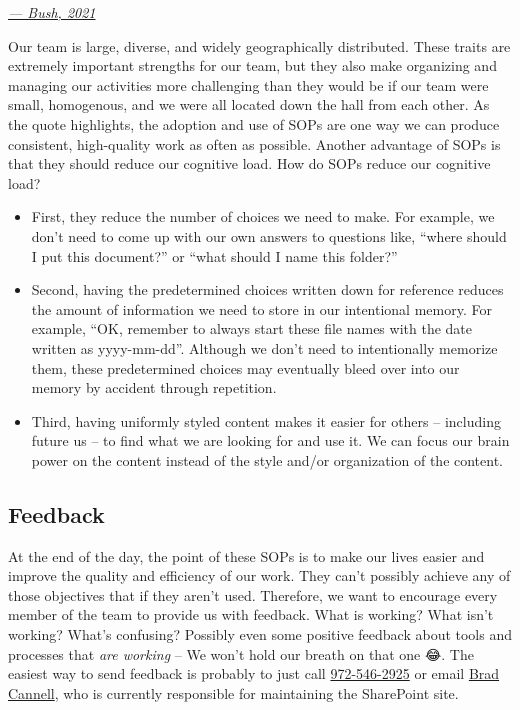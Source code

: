 \documentclass[
  letterpaper,
  DIV=11,
  numbers=noendperiod]{scrreprt}
\providecommand{\tightlist}{%
  \setlength{\itemsep}{0pt}\setlength{\parskip}{0pt}}\usepackage{longtable,booktabs,array}
\begin{document}
\emph{\href{https://www.techtarget.com/searchbusinessanalytics/definition/standard-operating-procedure-SOP}{---
Bush, 2021}}

Our team is large, diverse, and widely geographically distributed. These
traits are extremely important strengths for our team, but they also
make organizing and managing our activities more challenging than they
would be if our team were small, homogenous, and we were all located
down the hall from each other. As the quote highlights, the adoption and
use of SOPs are one way we can produce consistent, high-quality work as
often as possible. Another advantage of SOPs is that they should reduce
our cognitive load. How do SOPs reduce our cognitive load?

\begin{itemize}
\tightlist
\item
  First, they reduce the number of choices we need to make. For example,
  we don't need to come up with our own answers to questions like,
  ``where should I put this document?'' or ``what should I name this
  folder?''\\
\item
  Second, having the predetermined choices written down for reference
  reduces the amount of information we need to store in our intentional
  memory. For example, ``OK, remember to always start these file names
  with the date written as yyyy-mm-dd''. Although we don't need to
  intentionally memorize them, these predetermined choices may
  eventually bleed over into our memory by accident through
  repetition.\\
\item
  Third, having uniformly styled content makes it easier for others --
  including future us -- to find what we are looking for and use it. We
  can focus our brain power on the content instead of the style and/or
  organization of the content.
\end{itemize}

\subsection{Feedback}\label{feedback}

At the end of the day, the point of these SOPs is to make our lives
easier and improve the quality and efficiency of our work. They can't
possibly achieve any of those objectives that if they aren't used.
Therefore, we want to encourage every member of the team to provide us
with feedback. What is working? What isn't working? What's confusing?
Possibly even some positive feedback about tools and processes that
\emph{are working} -- We won't hold our breath on that one 😂. The
easiest way to send feedback is probably to just call
\href{tel:9725462925}{972-546-2925} or email
\href{mailto:Michael.B.Cannell@uth.tmc.edu}{Brad Cannell}, who is
currently responsible for maintaining the SharePoint site.
\end{document}
